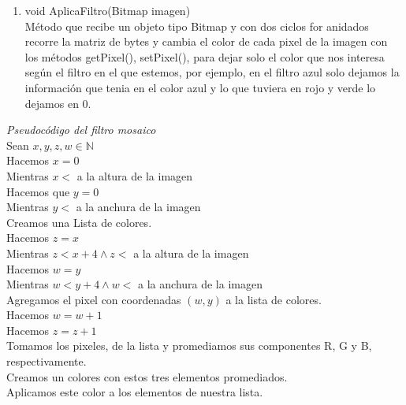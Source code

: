 \documentclass[12pt]{article}
\begin{document}
\begin{enumerate}
\begin{enumerate}
	\item void AplicaFiltro(Bitmap imagen)\\
		Método que recibe un objeto tipo Bitmap y con dos ciclos for anidados recorre la matriz de bytes y cambia el color de cada pixel de la imagen con los métodos getPixel(), setPixel(), para dejar solo el color que nos interesa según el filtro en el que estemos, por ejemplo, en el filtro azul solo dejamos la información que tenia en el color azul y lo que tuviera en rojo y verde lo dejamos en 0.
	\end{enumerate}	
	{\it Pseudocódigo del filtro mosaico}\\
	Sean $x, y, z, w \in \mathbb{N}$\\
	Hacemos $x = 0$\\
	Mientras $x <$ a la altura de la imagen\\
	\hspace*{1cm} Hacemos que $y = 0$\\
	\hspace*{1cm} Mientras $y <$ a la anchura de la imagen\\
		\hspace*{2cm}	Creamos una Lista de colores.\\
		\hspace*{2cm}	Hacemos $z = x$\\
		\hspace*{2cm}   Mientras $z < x + 4 \wedge z <$ a la altura de la imagen\\
			\hspace*{3cm}Hacemos $w = y$\\
				\hspace*{3cm}Mientras $w < y +4 \wedge w <$ a la anchura de la imagen\\
				\hspace*{3cm}Agregamos el pixel con coordenadas $(w, y)$ a la lista de colores.\\
				\hspace*{3cm}Hacemos $w = w + 1$\\
			\hspace*{2cm}Hacemos $z = z + 1$\\ 
			\hspace*{2cm}Tomamos los pixeles, de la lista y promediamos sus componentes R, G y B, respectivamente.\\
			\hspace*{2cm}Creamos un colores con estos tres elementos promediados.\\
			\hspace*{2cm}Aplicamos este color a los elementos de nuestra lista.\\

\end{enumerate}
\end{document}
